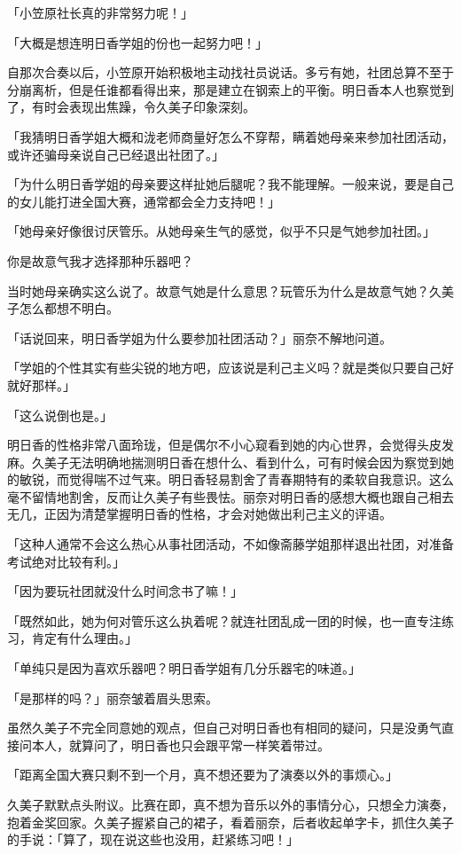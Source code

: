 \documentclass[UTF8]{ctexart}
\begin{document}
    「小笠原社长真的非常努力呢！」 

    「大概是想连明日香学姐的份也一起努力吧！」 

    自那次合奏以后，小笠原开始积极地主动找社员说话。多亏有她，社团总算不至于分崩离析，但是任谁都看得出来，那是建立在钢索上的平衡。明日香本人也察觉到了，有时会表现出焦躁，令久美子印象深刻。 

    「我猜明日香学姐大概和泷老师商量好怎么不穿帮，瞒着她母亲来参加社团活动，或许还骗母亲说自己已经退出社团了。」 

    「为什么明日香学姐的母亲要这样扯她后腿呢？我不能理解。一般来说，要是自己的女儿能打进全国大赛，通常都会全力支持吧！」 

    「她母亲好像很讨厌管乐。从她母亲生气的感觉，似乎不只是气她参加社团。」 

    你是故意气我才选择那种乐器吧？ 

    当时她母亲确实这么说了。故意气她是什么意思？玩管乐为什么是故意气她？久美子怎么都想不明白。 

    「话说回来，明日香学姐为什么要参加社团活动？」丽奈不解地问道。 

    「学姐的个性其实有些尖锐的地方吧，应该说是利己主义吗？就是类似只要自己好就好那样。」 

    「这么说倒也是。」 

    明日香的性格非常八面玲珑，但是偶尔不小心窥看到她的内心世界，会觉得头皮发麻。久美子无法明确地揣测明日香在想什么、看到什么，可有时候会因为察觉到她的敏锐，而觉得喘不过气来。明日香轻易割舍了青春期特有的柔软自我意识。这么毫不留情地割舍，反而让久美子有些畏怯。丽奈对明日香的感想大概也跟自己相去无几，正因为清楚掌握明日香的性格，才会对她做出利己主义的评语。 

    「这种人通常不会这么热心从事社团活动，不如像斋藤学姐那样退出社团，对准备考试绝对比较有利。」 

    「因为要玩社团就没什么时间念书了嘛！」 

    「既然如此，她为何对管乐这么执着呢？就连社团乱成一团的时候，也一直专注练习，肯定有什么理由。」 

    「单纯只是因为喜欢乐器吧？明日香学姐有几分乐器宅的味道。」 

    「是那样的吗？」丽奈皱着眉头思索。 

    虽然久美子不完全同意她的观点，但自己对明日香也有相同的疑问，只是没勇气直接问本人，就算问了，明日香也只会跟平常一样笑着带过。 

    「距离全国大赛只剩不到一个月，真不想还要为了演奏以外的事烦心。」 

    久美子默默点头附议。比赛在即，真不想为音乐以外的事情分心，只想全力演奏，抱着金奖回家。久美子握紧自己的裙子，看着丽奈，后者收起单字卡，抓住久美子的手说：「算了，现在说这些也没用，赶紧练习吧！」 
\end{document}

